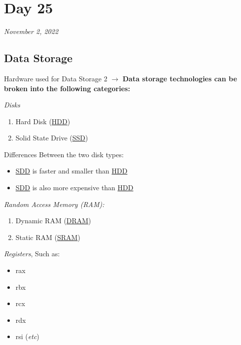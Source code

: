 \documentclass{report}
\begin{document}
\section{Day 25}
\begin{flushright}
  \emph{November 2, 2022}
\end{flushright}



\subsection{Data Storage}
  \begin{example} {Hardware used for Data Storage} { 2 }
    $\to$ \textbf{Data storage technologies can be broken into the following categories:} \\
    \par \emph {Disks}
    \begin{enumerate}
      \item Hard Disk (\underline{HDD})
    \item Solid State Drive (\underline{SSD})   \\
    \end{enumerate}
    \par
    Differences Between the two disk types: \\
    \begin{itemize}
      \item \underline{SDD} is faster and smaller than \underline{HDD}
      \item \underline{SDD} is also more expensive than \underline{HDD} \\
    \end{itemize}
    \par
    \emph{Random Access Memory (RAM): }\\
    \begin{enumerate}
      \item Dynamic RAM (\underline{DRAM})
      \item Static RAM (\underline{SRAM}) \\
    \end{enumerate}
    \par
    \emph {Registers}, Such as:
    \begin{itemize}
      \item rax
      \item rbx
      \item rcx
      \item rdx
      \item rsi (\emph{etc})
    \end{itemize}
  \end{example} 
\end{document}
